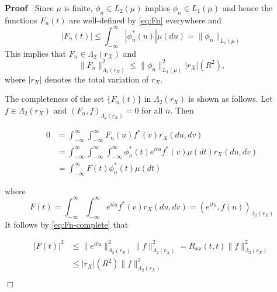 \documentclass{article}
\newenvironment{proof}{\noindent\textbf{Proof\ }}{\hspace*{\fill}$\Box$\medskip}
\begin{document}
\begin{proof}
  Since $\mu$ is finite, $\phi_n \in L_2 (\mu)$ implies $\phi_n \in L_1 (\mu)$
  and hence the functions $F_n (t)$ are well-defined by \eqref{eq:Fn}
  everywhere and
  \begin{equation}
    |F_n (t) | \leqslant \int_{- \infty}^{\infty} | \phi_n^{\ast} (u) | \mu
    (du) = \| \phi_n \|_{L_1 (\mu)} \label{eq:Fn-bound}
  \end{equation}
  This implies that $F_n \in \Lambda_2 (r_X)$ and
  \begin{equation}
    \|F_n \|_{\Lambda_2 (r_X)}^2 \leqslant \| \phi_n \|_{L_1 (\mu)}^2 |r_X |
    (R^2), \label{eq:Fn-norm}
  \end{equation}
  where $|r_X |$ denotes the total variation of $r_X$.
  
  The completeness of the set $\{F_n (t)\}$ in $\Lambda_2 (r_X)$ is shown as
  follows. Let $f \in \Lambda_2 (r_X)$ and $(F_n, f)_{\Lambda_2 (r_X)} = 0$
  for all $n$. Then
  
  \begin{align}
    0 & = \int_{- \infty}^{\infty} \int_{- \infty}^{\infty} F_n (u) f^{\ast}
    (v) r_X (du, dv) \\
    & = \int_{- \infty}^{\infty} \int_{- \infty}^{\infty} \int_{-
    \infty}^{\infty} \phi_n^{\ast} (t) e^{itu} f^{\ast} (v) \mu (dt) r_X (du,
    dv) \\
    & = \int_{- \infty}^{\infty} F (t) \phi_n^{\ast} (t) \mu (dt) 
    \label{eq:Fn-complete}
  \end{align}
  
  where
  \begin{equation}
    F (t) = \int_{- \infty}^{\infty} \int_{- \infty}^{\infty} e^{itu} f^{\ast}
    (v) r_X (du, dv) = (e^{itu}, f (u))_{\Lambda_2 (r_X)} \label{eq:F}
  \end{equation}
  It follows by \eqref{eq:Fn-complete} that
  
  \begin{align}
    |F (t) |^2 & \leqslant \|e^{itu} \|_{\Lambda_2 (r_X)}^2 \|f\|_{\Lambda_2
    (r_X)}^2 = R_{xx} (t, t) \|f\|_{\Lambda_2 (r_X)}^2 \\
    & \leqslant |r_X | (R^2) \|f\|_{\Lambda_2 (r_X)}^2  \label{eq:F-bound}
  \end{align}
  

\end{proof}
\end{document}
